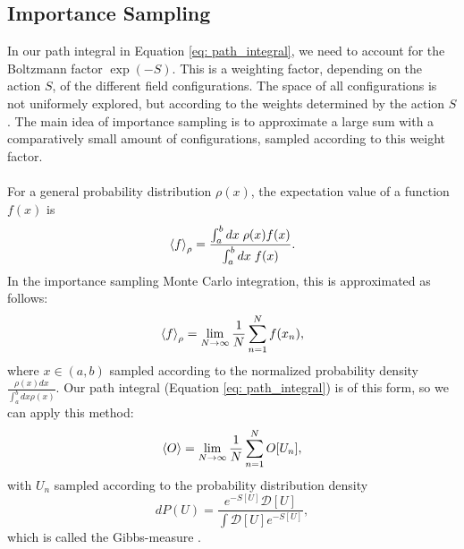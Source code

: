 \subsection{Importance Sampling}
In our path integral in Equation \ref{eq: path_integral}, we need to account for the Boltzmann factor $\exp(-S)$. This is a weighting factor, depending on the action $S$, of the different field configurations. 
The space of all configurations is not uniformely explored, but according to the weights determined by the action $S$. The main idea of importance sampling is to approximate a large sum with a comparatively small amount of configurations, sampled according to this weight factor. \\\\
For a general probability distribution $\rho(x)$, the expectation value of a function $f(x)$ is
\begin{equation}
    \braket{f}_\rho = \frac{\int_a^b dx \; \rho(x) f(x)}{\int_a^b dx \; f(x)}. 
\end{equation}
In the importance sampling Monte Carlo integration, this is approximated as follows: 
\begin{equation}
    \braket{f}_\rho = \lim_{N \rightarrow \infty} \frac{1}{N} \sum_{n = 1}^N f(x_n), 
\end{equation}
where $x \in (a, b)$ sampled according to the normalized probability density $\frac{\rho(x) dx}{\int_a^b dx \rho(x)}$. Our path integral (Equation \ref{eq: path_integral}) is of this form, so we can apply this method: 
\begin{equation}
    \braket{O} = \lim_{N \rightarrow \infty} \frac{1}{N} \sum_{n=1}^N O[U_n], 
\end{equation}
with $U_n$ sampled according to the probability distribution density 
\begin{equation}
    dP(U) = \frac{e^{-S[U]} \mathcal{D}[U]}{\int \mathcal{D}[U] e^{-S[U]}}, 
\end{equation}
which is called the Gibbs-measure \cite{GattingerLang}. 

